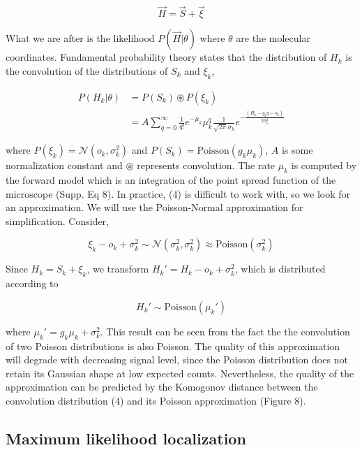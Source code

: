 \documentclass{ucetd}
\begin{document}
\begin{equation}
\vec{H} = \vec{S} + \vec{\xi}
\end{equation}

What we are after is the likelihood $P(\vec{H}|\theta)$ where $\theta$ are the molecular coordinates. Fundamental probability theory states that the distribution of $H_{k}$ is the convolution of the distributions of $S_{k}$ and $\xi_{k}$,

\begin{align}
P(H_{k}|\theta) &= P(S_{k})\circledast P(\xi_{k})\\
&= A\sum_{q=0}^{\infty} \frac{1}{q!}e^{-\mu_{k}}\mu_{k}^{q}\frac{1}{\sqrt{2\pi}\sigma_{k}}e^{-\frac{(H_{k}-g_{k}q-o_{k})}{2\sigma_{k}^{2}}}
\end{align}

where $P(\xi_{k}) = \mathcal{N}(o_{k},\sigma_{k}^{2})$ and $P(S_{k}) = \mathrm{Poisson}(g_{k}\mu_{k})$,  $A$ is some normalization constant and $\circledast$ represents convolution. The rate $\mu_{k}$ is computed by the forward model which is an integration of the point spread function of the microscope (Supp. Eq 8). In practice, (4) is difficult to work with, so we look for an approximation. We will use the Poisson-Normal approximation for simplification. Consider,

\begin{equation*}
\xi_{k} - o_{k} + \sigma_{k}^{2} \sim \mathcal{N}(\sigma_{k}^{2},\sigma_{k}^{2}) \approx \mathrm{Poisson}(\sigma_{k}^{2})
\end{equation*}

Since $H_{k} = S_{k} + \xi_{k}$, we transform $H_{k}' = H_{k} - o_{k} + \sigma_{k}^{2}$, which is distributed according to 

\begin{equation*}
H_{k}' \sim \mathrm{Poisson}(\mu_{k}')
\end{equation*}

where $\mu_{k}' = g_{k}\mu_{k} + \sigma_{k}^{2}$. This result can be seen from the fact the the convolution of two Poisson distributions is also Poisson. The quality of this approximation will degrade with decreasing signal level, since the Poisson distribution does not retain its Gaussian shape at low expected counts. Nevertheless, the quality of the approximation can be predicted by the Komogonov distance between the convolution distribution (4) and its Poisson approximation (Figure 8).

\subsection{Maximum likelihood localization}
\end{document}

